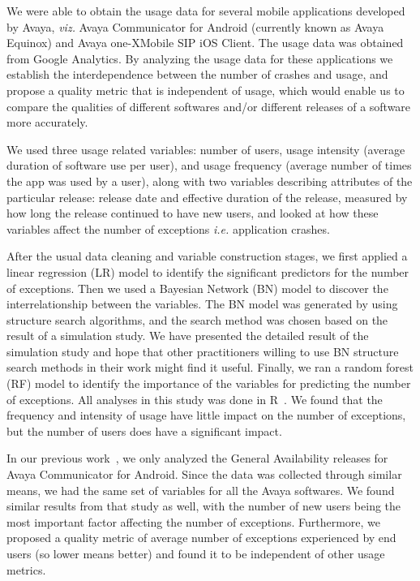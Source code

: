 \documentclass[smallextended]{svjour3}       %
\begin{document}
We were able to obtain the usage data for several mobile applications developed by Avaya, \textit{viz.}  Avaya Communicator for Android (currently known as Avaya Equinox\textregistered) and Avaya one-X\textregistered  Mobile SIP iOS Client. The usage data was obtained from Google Analytics. By analyzing the usage data for these applications we establish the interdependence between the number of crashes and usage, and propose a quality metric that is independent of usage, which would enable us to compare the qualities of different softwares and/or different releases of a software more accurately. 

We used three usage related variables: number of users, 
usage intensity (average duration of software use per user), and usage frequency 
(average number of times the app was used by a user), along with two variables describing attributes 
of the particular release: release date and effective duration of the release, measured by how 
long the release continued to have new users, and looked at how these variables affect 
the number of exceptions \textit{i.e.} application crashes.  

After the usual data cleaning and variable construction stages, we first applied a linear regression (LR) model to identify the significant predictors for the number of exceptions. Then we used a Bayesian Network (BN) model to discover the interrelationship between the variables. The BN model was generated by using structure search algorithms, and the search method was chosen based on the result of a simulation study. We have presented the detailed result of the simulation study and hope that other practitioners willing to use BN structure search methods in their work might find it useful.  Finally, we ran a random forest (RF) model to identify the importance of the variables for predicting the number of exceptions. All analyses in this study was done in R~\cite{R}. We found that the frequency and intensity of usage have little impact on the number of exceptions, but the number of users does have a significant impact. 

In our previous work~\cite{dey2018modeling}, we only analyzed the General Availability releases for  Avaya Communicator for Android. Since the data was collected through similar means, we had the same set of variables for all the Avaya softwares. We found similar results from that study as well, with the number of new users being the most important factor affecting the number of exceptions.
Furthermore, we proposed a quality metric of average number of exceptions experienced by end users (so lower means better) and found it to be independent of other usage metrics. 
\end{document}
